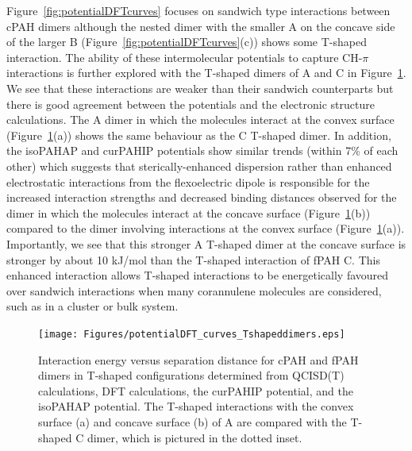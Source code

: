 Figure~\ref{fig:potentialDFTcurves} focuses on sandwich type interactions between cPAH dimers although the nested dimer with the smaller A on the concave side of the larger B (Figure~\ref{fig:potentialDFTcurves}(c)) shows some T-shaped interaction. 
The ability of these intermolecular potentials to capture CH-$\pi$ interactions is further explored with the T-shaped dimers of A and C in Figure~\ref{fig:potentialDFTcurves_Tshaped}. We see that these interactions are weaker than their sandwich counterparts but there is good agreement between the potentials and the electronic structure calculations. The A dimer in which the molecules interact at the convex surface (Figure~\ref{fig:potentialDFTcurves_Tshaped}(a)) shows the same behaviour as the C T-shaped dimer. In addition, the isoPAHAP and curPAHIP potentials show similar trends (within 7\% of each other) which suggests that sterically-enhanced dispersion rather than enhanced electrostatic interactions from the flexoelectric dipole is responsible for the increased interaction strengths and decreased binding distances observed for the dimer in which the molecules interact at the concave surface (Figure~\ref{fig:potentialDFTcurves_Tshaped}(b)) compared to the dimer involving interactions at the convex surface (Figure~\ref{fig:potentialDFTcurves_Tshaped}(a)). Importantly, we see that this stronger A T-shaped dimer at the concave surface is stronger by about 10 kJ/mol than the T-shaped interaction of fPAH C. This enhanced interaction allows T-shaped interactions to be energetically favoured over sandwich interactions when many corannulene molecules are considered, such as in a cluster or bulk system.
%
\begin{figure}[!tbh]
\centering
\texttt{[image: Figures/potentialDFT\_curves\_Tshapeddimers.eps]}
\caption{Interaction energy versus separation distance for cPAH and fPAH dimers in T-shaped configurations determined from QCISD(T) calculations\cite{janowski2010accurate}, DFT calculations, the curPAHIP potential, and the isoPAHAP potential. The T-shaped interactions with the convex surface (a) and concave surface (b) of A are compared with the T-shaped C dimer, which is pictured in the dotted inset.}
\label{fig:potentialDFTcurves_Tshaped}
\end{figure}
%

